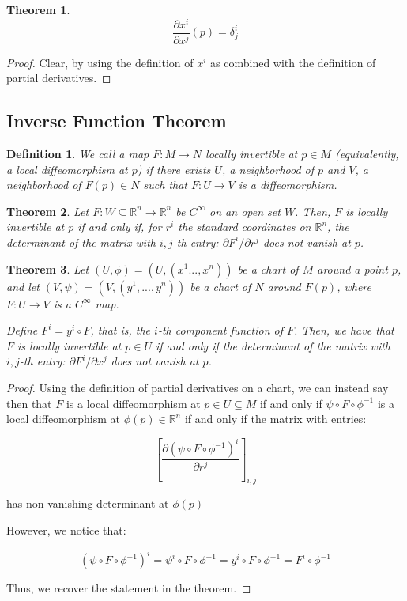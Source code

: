 \documentclass[10pt]{article}
\newtheorem{definition}{Definition}[section]
\newtheorem{theorem}{Theorem}[section]
\begin{document}
\begin{theorem}

$$ \frac{\partial x^i}{\partial x^j}(p) = \delta_j^i $$

\end{theorem}

\begin{proof}
Clear, by using the definition of $x^i$ as combined with the definition of partial derivatives.

\end{proof}

\subsection{Inverse Function Theorem}

\begin{definition}
We call a map $F: M \to N$ locally invertible at $p \in M$ (equivalently, a local diffeomorphism at $p$) if there exists $U$, a neighborhood of $p$ and $V$, a neighborhood of $F(p) \in N$ such that $F: U \to V$ is a diffeomorphism.
\end{definition}

\begin{theorem}
Let $F: W \subseteq \mathbb{R}^n \to \mathbb{R}^n$ be $C^\infty$ on an open set $W$. Then, $F$ is locally invertible at $p$ if and only if, for $r^i$ the standard coordinates on $\mathbb{R}^n$, the determinant of the matrix with $i,j$-th entry: $\partial F^i /\partial r^j$ does not vanish at $p$.
\end{theorem}

\begin{theorem}
Let $(U, \phi) = (U, (x^1...,x^n))$ be a chart of $M$ around a point $p$, and let $(V, \psi) = (V, (y^1,...,y^n))$ be a chart of $N$ around $F(p)$, where $F: U \to V$ is a $C^\infty$ map.

Define $F^i = y^i \circ F$, that is, the $i$-th component function of $F$. Then, we have that $F$ is locally invertible at $p \in U$ if and only if the determinant of the matrix with $i,j$-th entry: $\partial F^i /\partial x^j$ does not vanish at $p$.
\end{theorem}

\begin{proof}
Using the definition of partial derivatives on a chart, we can instead say then that $F$ is a local diffeomorphism at $p \in U \subseteq M$ if and only if $\psi \circ F \circ \phi^{-1}$ is a local diffeomorphism at $\phi(p) \in \mathbb{R}^n$ if and only if the matrix with entries:

$$\left[ \frac{\partial(\psi \circ F \circ \phi^{-1})^i}{\partial r^j} \right]_{i,j} $$

has non vanishing determinant at $\phi(p)$

However, we notice that:

$$(\psi \circ F \circ \phi^{-1})^i = \psi^i \circ F \circ \phi^{-1} = y^i \circ F \circ \phi^{-1} = F^i \circ \phi^{-1}$$

Thus, we recover the statement in the theorem.
\end{proof}
\end{document}
